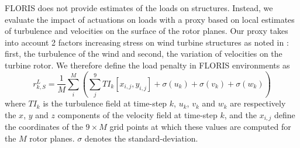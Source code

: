 \documentclass{article}
\begin{document}
FLORIS does not provide estimates of the loads on structures. Instead, we evaluate the impact of actuations on loads with a proxy based on local estimates of turbulence and velocities on the surface of the rotor planes. Our proxy takes into account 2 factors increasing stress on wind turbine structures as noted in \cite{stanley2022model}: first, the turbulence of the wind and second, the variation of velocities on the turbine rotor. 
We therefore define the load penalty in FLORIS environments as 
\begin{equation}\label{eq:reward_load_floris}
    r^L_{k, S} = \frac{1}{M} \sum_i^M \left( \sum_j^9 TI_{k}[x_{i,j},y_{i,j}] + \sigma(u_k) + \sigma({v_k}) + \sigma({w_k})  \right)
\end{equation}
where $TI_k$ is the turbulence field at time-step $k$, $u_k$, $v_k$ and $w_k$ are respectively the $x$, $y$ and $z$ components of the velocity field at time-step $k$, and the $x_{i,j}$ define the coordinates of the $ 9 \times M$ grid points at which these values are computed for the $M$ rotor planes. $\sigma$ denotes the standard-deviation.
%
\end{document}
